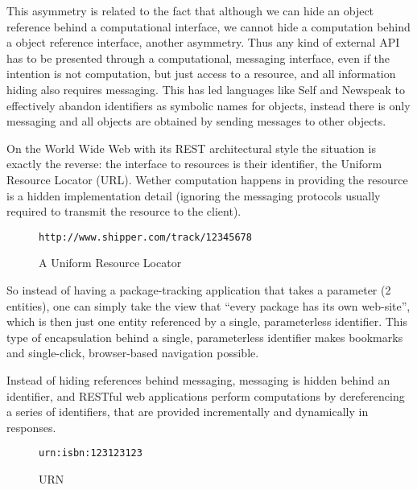 \documentclass[preprint,authoryear]{acm_proc_article-sp}
\begin{document}
This asymmetry is related to the fact that although we can hide an object reference 
behind a computational interface, we cannot
hide a computation behind a object reference interface, another asymmetry.
Thus any kind of external API has to be presented through a computational, messaging 
interface, even if the intention is not computation, but just access to a resource,
  and all information hiding also requires messaging.  This has led languages
like Self \cite{UngarS87} and Newspeak \cite{newspeak} to effectively abandon identifiers as symbolic names for objects, instead there is only messaging and
all objects are obtained by sending messages to other objects.

On the World Wide Web with its REST architectural style the situation is exactly the reverse: 
 the interface
to resources is their identifier, the Uniform Resource Locator (URL).   Wether
computation happens in providing the resource is a hidden implementation detail
(ignoring the messaging protocols usually required to transmit the resource
to the client).  


\begin{figure}[htbp]
\begin{center}
\begin{small}
\begin{verbatim}
http://www.shipper.com/track/12345678
\end{verbatim}
\end{small}
\caption{A Uniform Resource Locator}
\label{url-example}
\end{center}
\end{figure}

So instead of having
a package-tracking application that takes a parameter (2 entities),
one can simply take the view that ``every package has its own 
web-site'', which is then just one entity referenced by a single,
parameterless identifier.  This type of encapsulation behind
a single, parameterless identifier makes bookmarks and single-click,
browser-based navigation possible.


 Instead of hiding references behind messaging,
messaging is hidden behind an identifier, and RESTful web applications
perform computations by dereferencing a series of identifiers, that 
are provided incrementally and dynamically in responses.

\begin{figure}[htbp]
\begin{center}
\begin{small}
\begin{verbatim}
urn:isbn:123123123
\end{verbatim}
\end{small}
\caption{URN}
\label{urn-example}
\end{center}
\end{figure}
\end{document}
